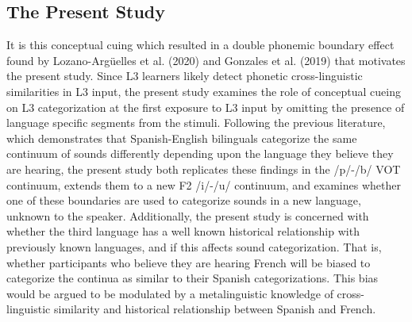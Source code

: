 \documentclass[
  man]{apa6}
\begin{document}
\hypertarget{the-present-study}{%
\subsection{The Present Study}\label{the-present-study}}

It is this conceptual cuing which resulted in a double phonemic boundary effect found by Lozano-Argüelles et al. (2020) and Gonzales et al. (2019) that motivates the present study.
Since L3 learners likely detect phonetic cross-linguistic similarities in L3 input, the present study examines the role of conceptual cueing on L3 categorization at the first exposure to L3 input by omitting the presence of language specific segments from the stimuli.
Following the previous literature, which demonstrates that Spanish-English bilinguals categorize the same continuum of sounds differently depending upon the language they believe they are hearing, the present study both replicates these findings in the /p/-/b/ VOT continuum, extends them to a new F2 /i/-/u/ continuum, and examines whether one of these boundaries are used to categorize sounds in a new language, unknown to the speaker. Additionally, the present study is concerned with whether the third language has a well known historical relationship with previously known languages, and if this affects sound categorization. That is, whether participants who believe they are hearing French will be biased to categorize the continua as similar to their Spanish categorizations. This bias would be argued to be modulated by a metalinguistic knowledge of cross-linguistic similarity and historical relationship between Spanish and French.
\end{document}
